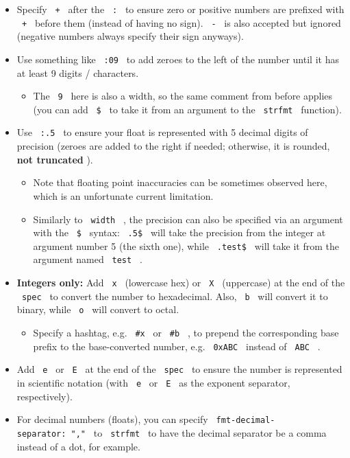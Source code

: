 \begin{itemize}
  \begin{itemize}
  \tightlist
  \item
    Specify \texttt{\ +\ } after the \texttt{\ :\ } to ensure zero or
    positive numbers are prefixed with \texttt{\ +\ } before them
    (instead of having no sign). \texttt{\ -\ } is also accepted but
    ignored (negative numbers always specify their sign anyways).
  \item
    Use something like \texttt{\ :09\ } to add zeroes to the left of the
    number until it has at least 9 digits / characters.

    \begin{itemize}
    \tightlist
    \item
      The \texttt{\ 9\ } here is also a width, so the same comment from
      before applies (you can add \texttt{\ \$\ } to take it from an
      argument to the \texttt{\ strfmt\ } function).
    \end{itemize}
  \item
    Use \texttt{\ :.5\ } to ensure your float is represented with 5
    decimal digits of precision (zeroes are added to the right if
    needed; otherwise, it is rounded, \textbf{not truncated} ).

    \begin{itemize}
    \tightlist
    \item
      Note that floating point inaccuracies can be sometimes observed
      here, which is an unfortunate current limitation.
    \item
      Similarly to \texttt{\ width\ } , the precision can also be
      specified via an argument with the \texttt{\ \$\ } syntax:
      \texttt{\ .5\$\ } will take the precision from the integer at
      argument number 5 (the sixth one), while \texttt{\ .test\$\ } will
      take it from the argument named \texttt{\ test\ } .
    \end{itemize}
  \item
    \textbf{Integers only:} Add \texttt{\ x\ } (lowercase hex) or
    \texttt{\ X\ } (uppercase) at the end of the \texttt{\ spec\ } to
    convert the number to hexadecimal. Also, \texttt{\ b\ } will convert
    it to binary, while \texttt{\ o\ } will convert to octal.

    \begin{itemize}
    \tightlist
    \item
      Specify a hashtag, e.g. \texttt{\ \#x\ } or \texttt{\ \#b\ } , to
      prepend the corresponding base prefix to the base-converted
      number, e.g. \texttt{\ 0xABC\ } instead of \texttt{\ ABC\ } .
    \end{itemize}
  \item
    Add \texttt{\ e\ } or \texttt{\ E\ } at the end of the
    \texttt{\ spec\ } to ensure the number is represented in scientific
    notation (with \texttt{\ e\ } or \texttt{\ E\ } as the exponent
    separator, respectively).
  \item
    For decimal numbers (floats), you can specify
    \texttt{\ fmt-decimal-separator:\ ","\ } to \texttt{\ strfmt\ } to
    have the decimal separator be a comma instead of a dot, for example.


\end{itemize}
\end{itemize}

